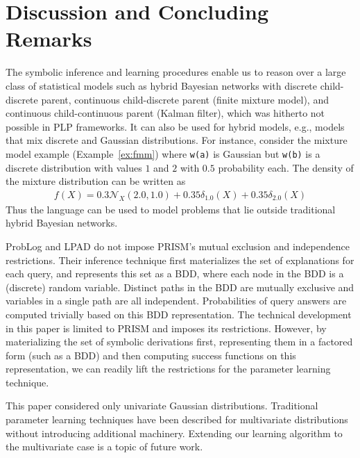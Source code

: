 \section{Discussion and Concluding Remarks}
\label{sec:extn}

The symbolic inference and learning procedures enable us to reason over 
a large class of statistical models such as hybrid Bayesian networks with discrete child-discrete parent, continuous child-discrete parent (finite mixture model), and continuous child-continuous parent (Kalman filter), which was hitherto not possible in PLP frameworks.  It can also be used for  hybrid models, e.g., models that mix discrete and Gaussian distributions.  For instance, consider the mixture model example (Example~\ref{ex:fmm}) where \texttt{w(a)} is Gaussian but \texttt{w(b)} is a discrete distribution with values $1$ and $2$ with $0.5$ probability each. The density of the mixture distribution can be written as 
\begin{align*}
f(X) = 0.3 \mathcal{N}_{X}(2.0, 1.0)  + 0.35  \delta_{1.0}(X)  + 0.35  \delta_{2.0}(X)
\end{align*}
Thus the language can be used to model problems that lie outside traditional hybrid Bayesian networks.

ProbLog and LPAD do not impose PRISM's mutual exclusion and independence restrictions.  Their inference technique first materializes the set of explanations for each query, and represents this set as a BDD, where each node in the BDD is a (discrete) random variable.  Distinct paths in the BDD are mutually exclusive and variables in a single path are all independent. Probabilities of query answers are computed trivially based on this BDD representation.  The technical development in this paper is limited to PRISM and imposes its restrictions.  However, by materializing the set of symbolic derivations first, representing them in a factored form (such as a BDD) and then computing success functions on this representation, we can readily lift the restrictions for the parameter learning technique.

 
This paper considered only univariate
Gaussian distributions.  Traditional parameter learning techniques have been described for multivariate distributions without introducing additional machinery.  Extending our learning algorithm to the multivariate case is a topic of future work. 



